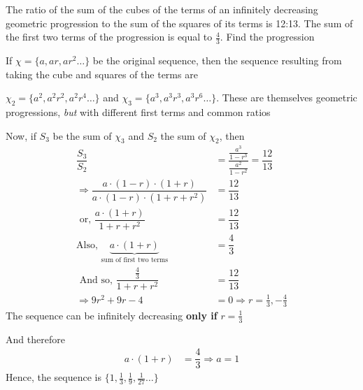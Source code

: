 

\question[3] The ratio of the sum of the cubes of the terms of an infinitely decreasing 
geometric progression to the sum of the squares of its terms is 12:13. The sum of the 
first two terms of the progression is equal to $\frac{4}{3}$. Find the progression


\ifprintanswers
\fi 

\begin{solution}[\halfpage]
   If $\chi = \lbrace a, ar, ar^2 \ldots\rbrace$ be the original sequence, then the sequence
   resulting from taking the cube and squares of the terms are
   
   $\chi_2 = \lbrace a^2, a^2r^2,a^2r^4 \ldots \rbrace$ and $ \chi_3 = \lbrace a^3, a^3r^3, a^3r^6 \ldots \rbrace$.
   These are themselves geometric progressions, \textit{but} with different first terms and common ratios
   
   Now, if $S_3$ be the sum of $\chi_3$ and $S_2$ the sum of $\chi_2$, then
   \begin{align}
   		\dfrac{S_3}{S_2} &= \dfrac{\frac{a^3}{1-r^3}}{\frac{a^2}{1-r^2}} = \dfrac{12}{13} \\
   		\Rightarrow \dfrac{a\cdot(1-r)\cdot(1+r)}{a\cdot(1-r)\cdot(1+r+r^2)} &= \dfrac{12}{13} \\
   		\text{ or, } \dfrac{a\cdot(1+r)}{1+r+r^2} &= \dfrac{12}{13} \\
   		\text{Also, } \underbrace{a\cdot(1+r)}_{\text{sum of first two terms}} &= \dfrac{4}{3} \\
   		\text{ And so, } \dfrac{\frac{4}{3}}{1+r+r^2} &= \dfrac{12}{13} \\
   		\Rightarrow 9r^2 + 9r - 4 &= 0 \Rightarrow r = \frac{1}{3},-\frac{4}{3}
   \end{align}
   The sequence can be infinitely decreasing \textbf{only if} $r = \frac{1}{3}$
   
   And therefore 
   \begin{align}
   	a\cdot(1+r) &= \dfrac{4}{3} \Rightarrow a = 1
   \end{align}
   Hence, the sequence is $\lbrace 1, \frac{1}{3}, \frac{1}{9}, \frac{1}{27} \ldots\rbrace$
\end{solution}
